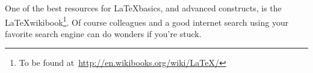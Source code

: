 
One of the best resources for \LaTeX basics, and advanced constructs, is the \LaTeX wikibook\footnote{To be found at~\url{http://en.wikibooks.org/wiki/LaTeX/}}. Of course colleagues and a good internet search using your favorite search engine can do wonders if you're stuck. 
